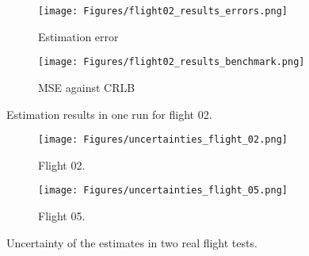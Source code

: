 \documentclass[journal]{IEEEtran}
\begin{document}
\begin{figure}[t]
\centering
    \begin{subfigure}[t]{0.49\columnwidth}
    \centering
	\texttt{[image: Figures/flight02\_results\_errors.png]}
    \caption{Estimation error}
    \label{fig:flight_02_results_errors}
    \end{subfigure}
    \hfill
    \begin{subfigure}[t]{0.49\columnwidth}
    \centering
	\texttt{[image: Figures/flight02\_results\_benchmark.png]}
    \caption{MSE against CRLB}
    \label{fig:flight_02_results_benchmark}
    \end{subfigure}
    \caption{Estimation results in one run for flight 02.}
    \label{fig:flight_02_estimation_results}
\end{figure}

\begin{figure}[t]
\centering
    \begin{subfigure}[t]{0.493\linewidth}
    \centering
    \texttt{[image: Figures/uncertainties\_flight\_02.png]}
    \caption{Flight 02.}
    \label{fig:uncertainties_flight_02}
    \end{subfigure}
    \hfill
    \begin{subfigure}[t]{0.493\linewidth}
    \centering
	\texttt{[image: Figures/uncertainties\_flight\_05.png]}
    \caption{Flight 05.}
    \label{fig:uncertainties_flight_05}
    \end{subfigure}
\caption{Uncertainty of the estimates in two real flight tests.}
\label{fig:uncertainty_metrics_real_flights}
\end{figure}
\end{document}

